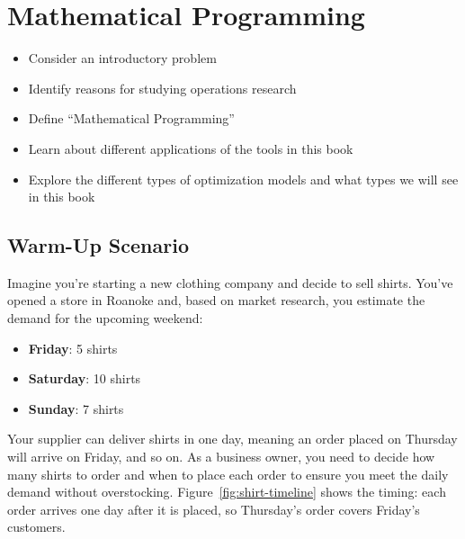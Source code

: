 

%

\chapter{Mathematical Programming}

\begin{outcome}
\begin{itemize}
\item Consider an introductory problem
\item Identify reasons for studying operations research
\item Define ``Mathematical Programming''
\item Learn about different applications of the tools in this book
\item Explore the different types of optimization models and what types we will see in this book
\end{itemize}
\end{outcome}
\section{Warm-Up Scenario}
\label{sec:shirt-warmup}

Imagine you’re starting a new clothing company and decide to sell shirts. You’ve opened a store in Roanoke and, based on market research, you estimate the demand for the upcoming weekend:

\begin{itemize}
    \item \textbf{Friday}: 5 shirts  
    \item \textbf{Saturday}: 10 shirts  
    \item \textbf{Sunday}: 7 shirts  
\end{itemize}

Your supplier can deliver shirts in one day, meaning an order placed on Thursday will arrive on Friday, and so on. As a business owner, you need to decide how many shirts to order and when to place each order to ensure you meet the daily demand without overstocking.  Figure~\ref{fig:shirt-timeline} shows the timing: each order arrives one day after it is placed, so Thursday's order covers Friday's customers.

